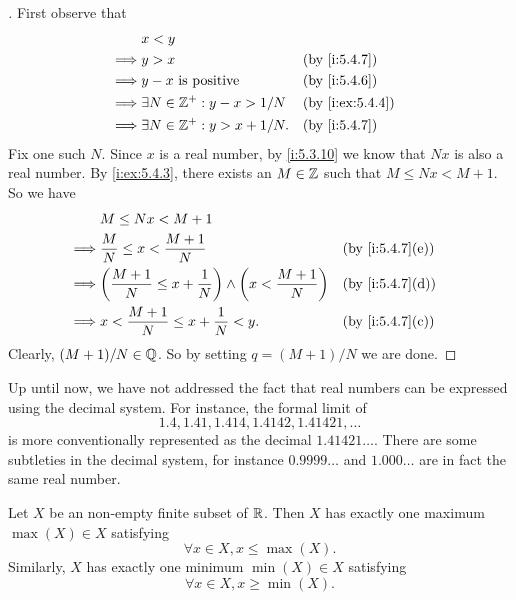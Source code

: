 \begin{proof}[]
  First observe that
  \begin{align*}
             & x < y                                                    \\
    \implies & y > x                               &  & \by{i:5.4.7}    \\
    \implies & y - x \text{ is positive}           &  & \by{i:5.4.6}    \\
    \implies & \exists N \in \Z^+ : y - x > 1 / N  &  & \by{i:ex:5.4.4} \\
    \implies & \exists N \in \Z^+ : y > x + 1 / N. &  & \by{i:5.4.7}
  \end{align*}
  Fix one such \(N\).
  Since \(x\) is a real number, by \cref{i:5.3.10} we know that \(Nx\) is also a real number.
  By \cref{i:ex:5.4.3}, there exists an \(M \in \mathbb{Z}\) such that \(M \leq Nx < M + 1\).
  So we have
  \begin{align*}
             & M \leq Nx < M + 1                                                                                \\
    \implies & \dfrac{M}{N} \leq x < \dfrac{M + 1}{N}                                      &  & \by{i:5.4.7}[e] \\
    \implies & \pa{\dfrac{M + 1}{N} \leq x + \dfrac{1}{N}} \land \pa{x < \dfrac{M + 1}{N}} &  & \by{i:5.4.7}[d] \\
    \implies & x < \dfrac{M + 1}{N} \leq x + \dfrac{1}{N} < y.                             &  & \by{i:5.4.7}[c]
  \end{align*}
  Clearly, \((M + 1) / N \in \mathbb{Q}\).
  So by setting \(q = (M + 1) / N\) we are done.
\end{proof}

\begin{rmk}\label{i:5.4.15}
  Up until now, we have not addressed the fact that real numbers can be expressed using the decimal system.
  For instance, the formal limit of
  \[
    1.4, 1.41, 1.414, 1.4142, 1.41421, \dots
  \]
  is more conventionally represented as the decimal \(1.41421\dots\).
  There are some subtleties in the decimal system, for instance \(0.9999\dots\) and \(1.000\dots\) are in fact the same real number.
\end{rmk}

\begin{ac}\label{i:ac:5.4.2}
  Let \(X\) be an non-empty finite subset of \(\mathbb{R}\).
  Then \(X\) has exactly one maximum \(\max(X) \in X\) satisfying
  \[
    \forall x \in X, x \leq \max(X).
  \]
  Similarly, \(X\) has exactly one minimum \(\min(X) \in X\) satisfying
  \[
    \forall x \in X, x \geq \min(X).
  \]
\end{ac}

